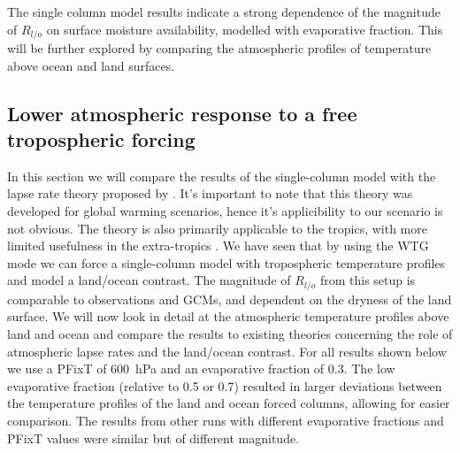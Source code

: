 The single column model results indicate a strong dependence of the magnitude of 
$R_{l/o}$ on surface moisture availability, modelled with evaporative fraction.  
This will be further explored by comparing the atmospheric profiles of 
temperature above ocean and land surfaces.


\subsection{Lower atmospheric response to a free tropospheric forcing}

In this section we will compare the results of the single-column model with the 
lapse rate theory proposed by \citet{Byrne2013a}. It's important to note that 
this theory was developed for global warming scenarios, hence it's applicibility 
to our scenario is not obvious. The theory is also primarily applicable to the 
tropics, with more limited usefulness in the extra-tropics \citep{Byrne2013a}.  
We have seen that by using the WTG mode we can force a single-column model with 
tropospheric temperature profiles and model a land/ocean contrast.  The 
magnitude of $R_{l/o}$ from this setup is comparable to observations and GCMs, 
and dependent on the dryness of the land surface.  We will now look in detail at 
the atmospheric temperature profiles above land and ocean and compare the 
results to existing theories concerning the role of atmospheric lapse rates and 
the land/ocean contrast. For all results shown below we use a PFixT of 
\SI{600}{\hecto\pascal} and an evaporative fraction of 0.3.  The low evaporative 
fraction (relative to 0.5 or 0.7) resulted in larger deviations between the 
temperature profiles of the land and ocean forced columns, allowing for easier 
comparison. The results from other runs with different evaporative fractions and 
PFixT values were similar but of different magnitude.\\

